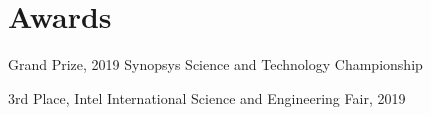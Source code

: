 \documentclass[letterpaper,11pt]{article}
\newenvironment{resumeSubheadingList}
{\begin{itemize}[leftmargin=0.1in, label={}, noitemsep, topsep=0pt]}
{\end{itemize}}
\newenvironment{resumeListBulleted}[1][0.17in]
{\begin{itemize}[leftmargin=#1, noitemsep, topsep=0pt]\begin{small}}
{\end{small}\end{itemize}}
\begin{document}

\section{Awards}
\begin{resumeSubheadingList}
  \item
  \begin{resumeListBulleted}
    \item Grand Prize, 2019 Synopsys Science and Technology Championship
    \item 3rd Place, Intel International Science and Engineering Fair, 2019
  \end{resumeListBulleted}
\end{resumeSubheadingList}

\end{document}
